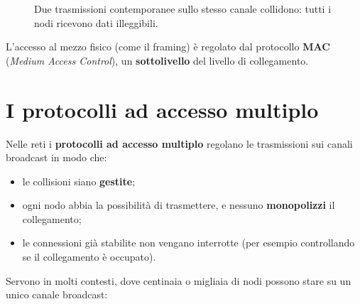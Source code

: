 \begin{figure}[H]
\centering
{}
\caption{Due trasmissioni contemporanee sullo stesso canale collidono: tutti i nodi ricevono dati illeggibili.}
\end{figure}

L'accesso al mezzo fisico (come il framing) è regolato dal protocollo \textbf{MAC} (\emph{Medium Access Control}), un
\textbf{sottolivello} del livello di collegamento.

\section{I protocolli ad accesso multiplo}

Nelle reti i \textbf{protocolli ad accesso multiplo} regolano le trasmissioni sui canali broadcast in modo che:

\begin{itemize}
    \item le collisioni siano \textbf{gestite};
    \item ogni nodo abbia la possibilità di trasmettere, e nessuno \textbf{monopolizzi} il collegamento;
    \item le connessioni già stabilite non vengano interrotte (per esempio controllando se il collegamento è occupato).
\end{itemize}

Servono in molti contesti, dove centinaia o migliaia di nodi possono stare su un unico canale broadcast:

